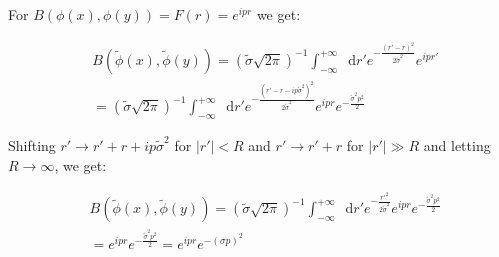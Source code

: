 \documentclass[aspectratio=169]{beamer}
\newcommand{\diffop}{\mathop{}\!\mathrm{d}}
\newcommand{\drp}{\diffop r'}
\newcommand{\intii}{\int_{-\infty}^{+\infty}}
\newcommand{\phit}{\tilde{\phi}}
\newcommand{\sigmat}{\tilde{\sigma}}
\begin{document}
\begin{frame}
For $B(\phi(x), \phi(y)) = F(r) = e^{ipr}$ we get:

\begin{equation*}
\begin{split}
&B(\phit(x), \phit(y)) = (\sigmat \sqrt{2\pi})^{-1} \intii \drp e^{-\frac{(r' - r)^2}{2 \sigmat^2}} e^{ipr'} \\
&= (\sigmat \sqrt{2\pi})^{-1} \intii \drp e^{-\frac{(r' - r - ip\sigmat^2)^2}{2 \sigmat^2}} e^{ipr} e^{-\frac{\sigmat^2 p^2}{2}}
\end{split}
\end{equation*}

Shifting $r' \to r'  + r + ip\sigmat^2$ for $|r'| < R$ and $r' \to r' + r$ for $|r'| \gg R$ and letting $R \to \infty$, we get:

\begin{equation*}
\begin{split}
&B(\phit(x), \phit(y)) = (\sigmat \sqrt{2\pi})^{-1} \intii \drp e^{-\frac{{r'}^2}{2 \sigmat^2}} e^{ipr} e^{-\frac{\sigmat^2 p^2}{2}} \\
&= e^{ipr} e^{-\frac{\sigmat^2 p^2}{2}} = e^{ipr} e^{-(\sigma p)^2}
\end{split}
\end{equation*}
\end{frame}
\end{document}
